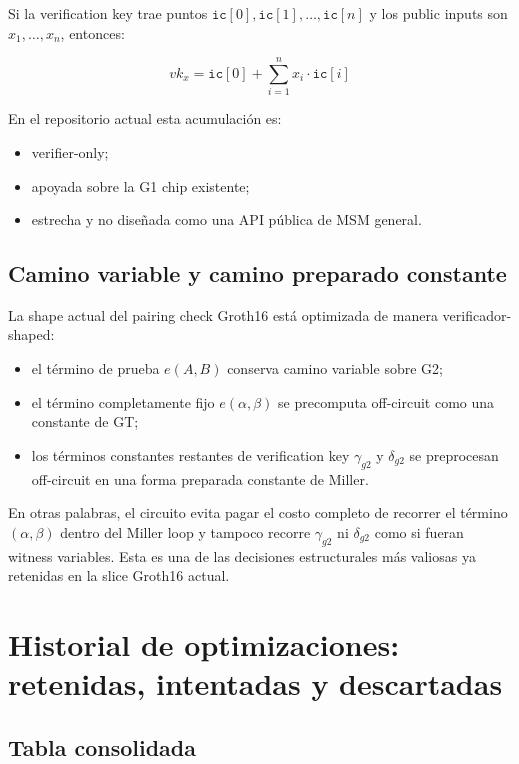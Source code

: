 \documentclass[11pt,a4paper]{article}
\begin{document}
Si la verification key trae puntos
\(\texttt{ic}[0], \texttt{ic}[1], \dots, \texttt{ic}[n]\)
y los public inputs son
\(x_1,\dots,x_n\),
entonces:

\[
vk_x = \texttt{ic}[0] + \sum_{i=1}^{n} x_i \cdot \texttt{ic}[i]
\]

En el repositorio actual esta acumulaci\'on es:

\begin{itemize}
  \item verifier-only;
  \item apoyada sobre la G1 chip existente;
  \item estrecha y no dise\~nada como una API p\'ublica de MSM general.
\end{itemize}

\subsection{Camino variable y camino preparado constante}

La shape actual del pairing check Groth16 est\'a optimizada de manera verificador-shaped:

\begin{itemize}
  \item el t\'ermino de prueba \(e(A,B)\) conserva camino variable sobre G2;
  \item el t\'ermino completamente fijo \(e(\alpha,\beta)\) se precomputa
  off-circuit como una constante de GT;
  \item los t\'erminos constantes restantes de verification key
  \(\gamma_{g2}\) y \(\delta_{g2}\)
  se preprocesan off-circuit en una forma preparada constante de Miller.
\end{itemize}

En otras palabras, el circuito evita pagar el costo completo de recorrer el
t\'ermino \((\alpha,\beta)\) dentro del Miller loop y tampoco recorre
\(\gamma_{g2}\) ni \(\delta_{g2}\) como si fueran witness variables. Esta es
una de las decisiones estructurales m\'as valiosas ya retenidas en la slice
Groth16 actual.

\section{Historial de optimizaciones: retenidas, intentadas y descartadas}

\subsection{Tabla consolidada}
\end{document}
